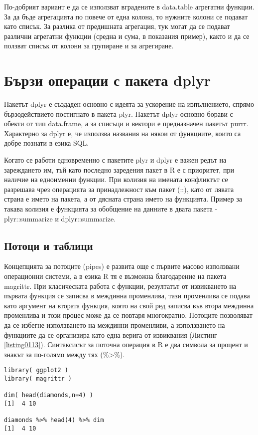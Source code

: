 По-добрият вариант е да се използват вградените в data.table агрегатни функции. За да бъде агрегацията по повече от една колона, то нужните колони се подават като списък. За разлика от предишната агрегация, тук могат да се подават различни агрегатни функции (средна и сума, в показания пример), както и да се ползват списък от колони за групиране и за агрегиране. 

\section{Бързи операции с пакета dplyr}

Пакетът dplyr е създаден основно с идеята за ускорение на изпълнението, спрямо бързодействието постигнато в пакета plyr. Пакетът dplyr основно борави с обекти от тип data.frame, а за списъци и вектори е предназначен пакетът purrr. Характерно за dplyr е, че използва названия на някои от функциите, които са добре познати в езика SQL. 

Когато се работи едновременно с пакетите plyr и dplyr е важен редът на зареждането им, тъй като последно заредения пакет в R е с приоритет, при наличие на едноименни функции. При колизия на имената конфликтът се разрешава чрез операцията за принадлежност към пакет (::), като от лявата страна е името на пакета, а от дясната страна името на функцията. Пример за такава колизия е функцията за обобщение на данните в двата пакета - plyr::summarize и dplyr::summarize.

\subsection{Потоци и таблици}

Концепцията за потоците (pipes) е развита още с първите масово използвани операционни системи, а в езика R тя е възможна благодарение на пакета magrittr. При класическата работа с функции, резултатът от извикването на първата функция се записва в междинна променлива, тази променлива се подава като аргумент на втората функция, която на свой ред записва във втора междинна променлива и този процес може да се повтаря многократно. Потоците позволяват да се избегне използването на междинни променливи, а използването на функциите да се организира като една верига от извиквания (Листинг \ref{listing0113}). Синтаксисът за поточна операция в R е два символа за процент и знакът за по-голямо между тях (\%>\%).

\begin{lstlisting}[caption=Поточни операции, label=listing0113]
library( ggplot2 )
library( magrittr )
 
dim( head(diamonds,n=4) )
[1]  4 10
 
diamonds %>% head(4) %>% dim
[1]  4 10
\end{lstlisting}

